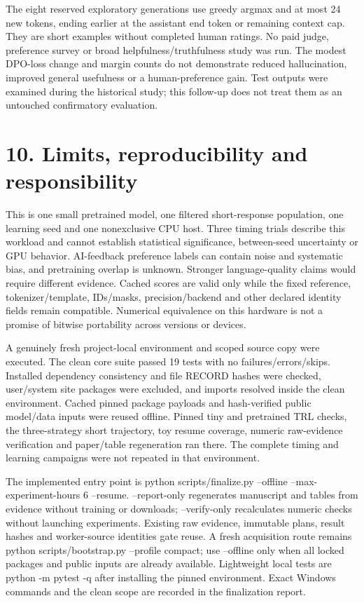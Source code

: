 \documentclass[10pt]{article}
\begin{document}
The eight reserved exploratory generations use greedy argmax and at most 24 new tokens, ending earlier at the assistant end token or remaining context cap. They are short examples without completed human ratings. No paid judge, preference survey or broad helpfulness/truthfulness study was run. The modest DPO-loss change and margin counts do not demonstrate reduced hallucination, improved general usefulness or a human-preference gain. Test outputs were examined during the historical study; this follow-up does not treat them as an untouched confirmatory evaluation.


\section*{10. Limits, reproducibility and responsibility}

This is one small pretrained model, one filtered short-response population, one learning seed and one nonexclusive CPU host. Three timing trials describe this workload and cannot establish statistical significance, between-seed uncertainty or GPU behavior. AI-feedback preference labels can contain noise and systematic bias, and pretraining overlap is unknown. Stronger language-quality claims would require different evidence. Cached scores are valid only while the fixed reference, tokenizer/template, IDs/masks, precision/backend and other declared identity fields remain compatible. Numerical equivalence on this hardware is not a promise of bitwise portability across versions or devices.


A genuinely fresh project-local environment and scoped source copy were executed. The clean core suite passed 19 tests with no failures/errors/skips. Installed dependency consistency and file RECORD hashes were checked, user/system site packages were excluded, and imports resolved inside the clean environment. Cached pinned package payloads and hash-verified public model/data inputs were reused offline. Pinned tiny and pretrained TRL checks, the three-strategy short trajectory, toy resume coverage, numeric raw-evidence verification and paper/table regeneration ran there. The complete timing and learning campaigns were not repeated in that environment.


The implemented entry point is python scripts/finalize.py --offline --max-experiment-hours 6 --resume. --report-only regenerates manuscript and tables from evidence without training or downloads; --verify-only recalculates numeric checks without launching experiments. Existing raw evidence, immutable plans, result hashes and worker-source identities gate reuse. A fresh acquisition route remains python scripts/bootstrap.py --profile compact; use --offline only when all locked packages and public inputs are already available. Lightweight local tests are python -m pytest -q after installing the pinned environment. Exact Windows commands and the clean scope are recorded in the finalization report.
\end{document}
